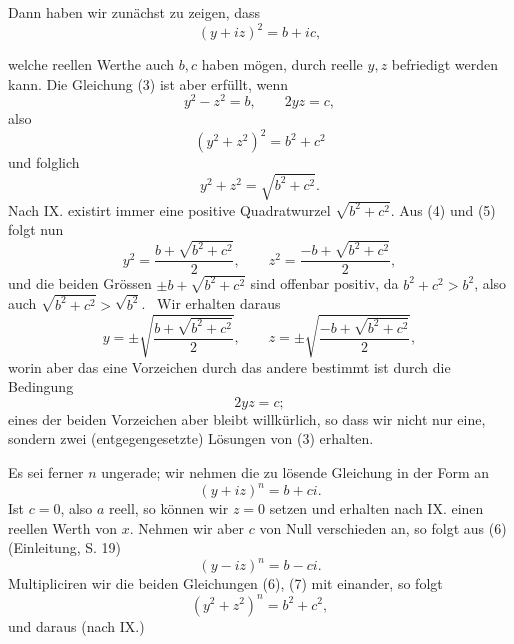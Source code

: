 
Dann haben wir zunächst zu zeigen, dass
\begin{equation}
 (y+iz)^2=b+ic,
\tag{3}
\end{equation}

\noindent welche reellen Werthe auch $b,c$ haben mögen, durch reelle $y,z$ befriedigt werden kann. Die Gleichung (3) ist aber erfüllt, wenn
\begin{equation}
 y^2-z^2=b,\qquad 2yz=c,
\tag{4}
\end{equation}
also
\[
 (y^2+z^2)^2=b^2+c^2
\]
und folglich
\begin{equation}
 y^2+z^2=\sqrt{b^2+c^2}.
\tag{5}
\end{equation}
Nach IX. existirt immer eine positive Quadratwurzel $\sqrt{b^2+c^2}$. Aus (4) und (5) folgt nun
\[
 y^2=\frac{b+\sqrt{b^2+c^2}}{2},\qquad
 z^2=\frac{-b+\sqrt{b^2+c^2}}{2},
\]
und die beiden Grössen $\pm b+\sqrt{b^2+c^2}$ sind offenbar positiv, da $b^2+c^2>b^2$, also auch $\sqrt{b^2+c^2}>\sqrt{b^2}$.%
\ Wir erhalten daraus
\[
 y=\pm\sqrt{\frac{b+\sqrt{b^2+c^2}}{2}},\qquad
 z=\pm\sqrt{\frac{-b+\sqrt{b^2+c^2}}{2}},
\]
worin aber das eine Vorzeichen durch das andere bestimmt ist durch die Bedingung
\[
 2yz=c;
\]
eines der beiden Vorzeichen aber bleibt willkürlich, so dass wir nicht nur eine, sondern zwei (entgegengesetzte) Lösungen von (3) erhalten.

Es sei ferner $n$ ungerade; wir nehmen die zu lösende Gleichung in der Form an
\begin{equation}
 (y+iz)^n=b+ci.
\tag{6}
\end{equation}
Ist $c=0$, also $a$ reell, so können wir $z=0$ setzen und erhalten nach IX. einen reellen Werth von $x$. Nehmen wir aber $c$ von Null verschieden an, so folgt aus (6) (Einleitung, S. 19)
\begin{equation}
 (y-iz)^n=b-ci.
\tag{7}
\end{equation}
Multipliciren wir die beiden Gleichungen (6), (7) mit einander, so folgt
\[
 (y^2+z^2)^n=b^2+c^2,
\]
und daraus (nach IX.)
